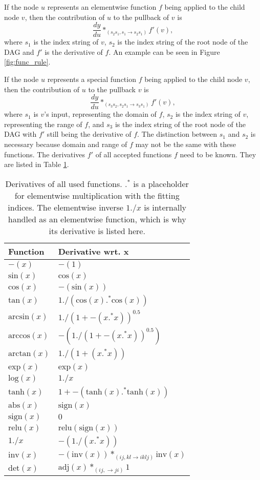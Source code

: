 \documentclass[12pt, a4paper]{report} %
\begin{document}
If the node $u$ represents an elementwise function $f$ being applied to the child node $v$, then the contribution of $u$ to the pullback of $v$ is 
$$
\frac{dy}{du} *_{(s_2s_1,s_1 \rightarrow s_2s_1)} f'(v),
$$
where $s_1$ is the index string of $v$, $s_2$ is the index string of the root node of the DAG and $f'$ is the derivative of $f$.
An example can be seen in Figure \ref{fig:func_rule}.

If the node $u$ represents a special function $f$ being applied to the child node $v$, then the contribution of $u$ to the pullback $v$ is
$$
\frac{dy}{du} *_{(s_3s_2,s_2s_1 \rightarrow s_3s_1)} f'(v),
$$
where $s_1$ is $v$'s input, representing the domain of $f$, $s_2$ is the index string of $v$, representing the range of $f$, and $s_3$ is the index string of the root node of the DAG with $f'$ still being the derivative of $f$.
The distinction between $s_1$ and $s_2$ is necessary because domain and range of $f$ may not be the same with these functions.
The derivatives $f'$ of all accepted functions $f$ need to be known.
They are listed in Table \ref{tab:func_diffs}.

\begin{table}[ht]
    \centering
    \begin{tabular}{l | l}
        Function & Derivative wrt. x \\\hline
        $-(x)$ & $-(1)$ \\
        $\text{sin}(x)$ & $\text{cos}(x)$ \\
        $\text{cos}(x)$ & $-(\text{sin}(x))$ \\
        $\text{tan}(x)$ & $1 ./ (\text{cos}(x) .^* \text{cos}(x))$ \\
        $\text{arcsin}(x)$ & $1 ./ (1 + -(x .^* x))^{0.5}$ \\
        $\text{arccos}(x)$ & $-(1 ./ (1 + -(x .^* x))^{0.5})$ \\
        $\text{arctan}(x)$ & $1 ./ (1 + (x .^* x))$ \\
        $\text{exp}(x)$ & $\text{exp}(x)$ \\
        $\text{log}(x)$ & $1 ./ x$ \\
        $\text{tanh}(x)$ & $1 + -(\text{tanh}(x) .^* \text{tanh}(x))$ \\
        $\text{abs}(x)$ & $\text{sign}(x)$ \\
        $\text{sign}(x)$ & $0$ \\
        $\text{relu}(x)$ & $\text{relu}(\text{sign}(x))$ \\
        $1 ./ x$ & $- (1 ./ (x .^* x))$ \\
        $\text{inv}(x)$ & $-(\text{inv}(x)) *_{(ij,kl \rightarrow iklj)} \text{inv}(x)$ \\
        $\text{det}(x)$ & $\text{adj}(x) *_{(ij, \rightarrow ji)} 1$ \\
    \end{tabular}
    \caption[List of All Function Derivatives Used in Differentiation]{Derivatives of all used functions. $.^*$ is a placeholder for elementwise multiplication with the fitting indices. The elementwise inverse $1 ./ x$ is internally handled as an elementwise function, which is why its derivative is listed here.}
    \label{tab:func_diffs}
\end{table}
\end{document}
